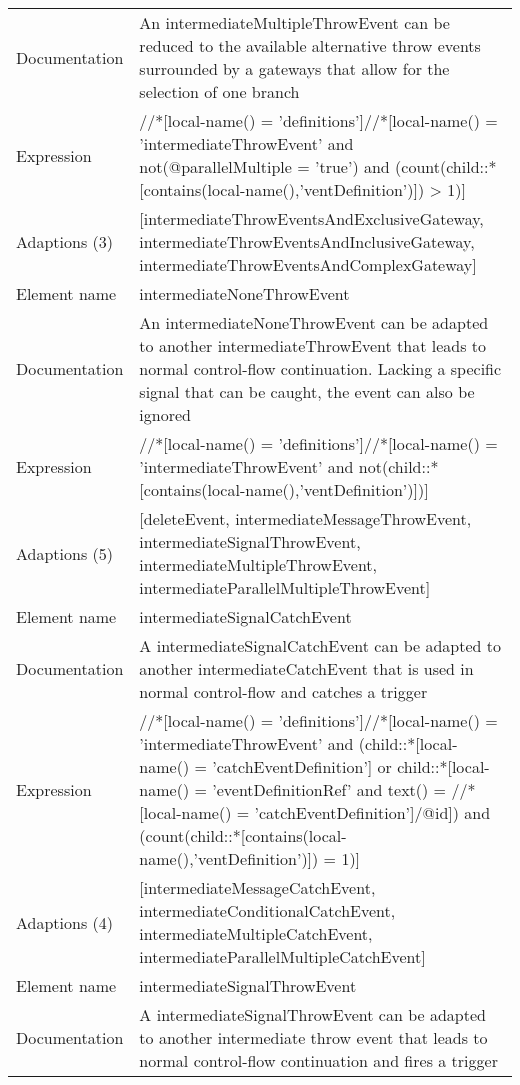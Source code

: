 \begin{center}
\begin{tiny}
\begin{longtable}{p{}|p{}}
\myrowcolour
Documentation &An intermediateMultipleThrowEvent can be reduced to the available alternative throw events surrounded by a gateways that allow for the selection of one branch\\
Expression & //*[local-name() = 'definitions']//*[local-name() = 'intermediateThrowEvent' and not(@parallelMultiple = 'true') and (count(child::*[contains(local-name(),'ventDefinition')]) > 1)]\\
\myrowcolour
Adaptions (3) & [intermediateThrowEventsAndExclusiveGateway, intermediateThrowEventsAndInclusiveGateway, intermediateThrowEventsAndComplexGateway]\\
\midrule
Element name & intermediateNoneThrowEvent\\
\myrowcolour
Documentation &An intermediateNoneThrowEvent can be adapted to another intermediateThrowEvent that leads to normal control-flow continuation. Lacking a specific signal that can be caught, the event can also be ignored\\
Expression & //*[local-name() = 'definitions']//*[local-name() = 'intermediateThrowEvent' and not(child::*[contains(local-name(),'ventDefinition')])]\\
\myrowcolour
Adaptions (5) & [deleteEvent, intermediateMessageThrowEvent, intermediateSignalThrowEvent, intermediateMultipleThrowEvent, intermediateParallelMultipleThrowEvent]\\
\midrule
Element name & intermediateSignalCatchEvent\\
\myrowcolour
Documentation &A intermediateSignalCatchEvent can be adapted to another intermediateCatchEvent that is used in normal control-flow and catches a trigger\\
Expression & //*[local-name() = 'definitions']//*[local-name() = 'intermediateThrowEvent' and (child::*[local-name() = 'catchEventDefinition'] or child::*[local-name() = 'eventDefinitionRef' and text() = //*[local-name() = 'catchEventDefinition']/@id]) and (count(child::*[contains(local-name(),'ventDefinition')]) = 1)]\\
\myrowcolour
Adaptions (4) & [intermediateMessageCatchEvent, intermediateConditionalCatchEvent, intermediateMultipleCatchEvent, intermediateParallelMultipleCatchEvent]\\
\midrule
Element name & intermediateSignalThrowEvent\\
\myrowcolour
Documentation &A intermediateSignalThrowEvent can be adapted to another intermediate throw event that leads to normal control-flow continuation and fires a trigger\\

\end{longtable}
\end{tiny}
\end{center}
